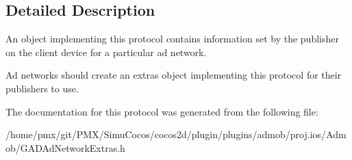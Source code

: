 \subsection{Detailed Description}
An object implementing this protocol contains information set by the publisher on the client device for a particular ad network.

Ad networks should create an \textquotesingle{}extras\textquotesingle{} object implementing this protocol for their publishers to use. 

The documentation for this protocol was generated from the following file\+:\begin{DoxyCompactItemize}
\item 
/home/pmx/git/\+P\+M\+X/\+Simu\+Cocos/cocos2d/plugin/plugins/admob/proj.\+ios/\+Admob/G\+A\+D\+Ad\+Network\+Extras.\+h\end{DoxyCompactItemize}
